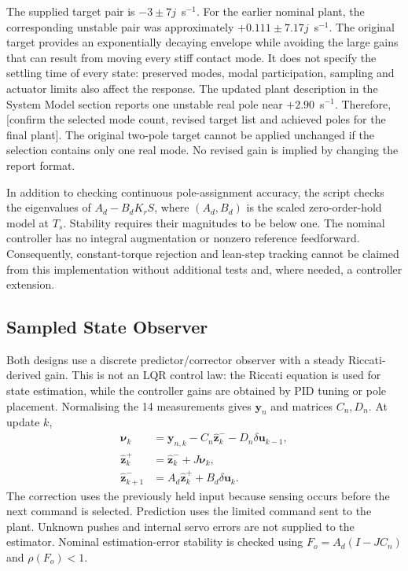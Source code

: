 \documentclass[conference,a4paper]{IEEEtran}
\begin{document}
The supplied target pair is $-3\pm7j$~s$^{-1}$. For the earlier nominal plant,
the corresponding unstable pair was approximately $+0.111\pm7.17j$~s$^{-1}$.
The original target provides an exponentially decaying envelope while
avoiding the large gains that can result from moving every stiff contact mode. It does
not specify the settling time of every state: preserved modes, modal
participation, sampling and actuator limits also affect the response.
The updated plant description in the System Model section reports one
unstable real pole near $+2.90$~s$^{-1}$. Therefore, [confirm the selected mode
count, revised target list and achieved poles for the final plant]. The
original two-pole target cannot be applied unchanged if the selection
contains only one real mode. No revised gain is implied by changing the
report format.

In addition to checking continuous pole-assignment accuracy, the script
checks the eigenvalues of $A_d-B_dK_rS$, where $(A_d,B_d)$ is the scaled
zero-order-hold model at $T_s$. Stability requires their magnitudes to be
below one. The nominal controller has no integral augmentation or nonzero
reference feedforward. Consequently, constant-torque rejection and lean-step
tracking cannot be claimed from this implementation without additional tests
and, where needed, a controller extension.


\subsection{Sampled State Observer}
Both designs use a discrete predictor/corrector observer with a steady
Riccati-derived gain. This is not an LQR control law: the Riccati equation is
used for state estimation, while the controller gains are obtained by PID
tuning or pole placement. Normalising the 14 measurements gives $\mathbf y_n$
and matrices $C_n,D_n$. At update $k$,
\begin{align}
 \boldsymbol\nu_k&=\mathbf y_{n,k}-C_n\hat{\mathbf z}_k^-
                         -D_n\delta\mathbf u_{k-1},\\
 \hat{\mathbf z}_k^+&=\hat{\mathbf z}_k^-+J\boldsymbol\nu_k,\\
 \hat{\mathbf z}_{k+1}^-&=A_d\hat{\mathbf z}_k^+
                         +B_d\delta\mathbf u_k.
\end{align}
The correction uses the previously held input because sensing occurs before
the next command is selected. Prediction uses the limited command sent to the
plant. Unknown pushes and internal servo errors are not supplied to the
estimator. Nominal estimation-error stability is checked using
$F_o=A_d(I-JC_n)$ and $\rho(F_o)<1$.
\end{document}
